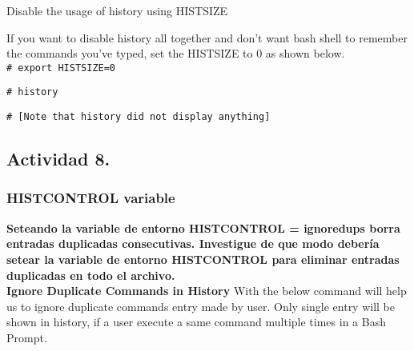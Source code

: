 \documentclass[a4paper,11pt,spanish]{article} %
\begin{document}
Disable the usage of history using HISTSIZE

If you want to disable history all together and don’t want bash shell to remember the 
commands you’ve typed, set the HISTSIZE to 0 as shown below.\\

\texttt{\# export HISTSIZE=0}

\texttt{\# history}

\texttt{\# [Note that history did not display anything]}\\

\cite{tecmint}

\subsection{Actividad 8.}

\subsubsection{HISTCONTROL variable}

\textbf{Seteando la variable de entorno HISTCONTROL = ignoredups borra entradas duplicadas consecutivas.
Investigue de que modo debería setear la variable de entorno HISTCONTROL para 
eliminar entradas duplicadas en todo el archivo.}\\

\textbf{Ignore Duplicate Commands in History}
With the below command will help us to ignore duplicate commands entry made by user. 
Only single entry will be shown in history, if a user execute a same command multiple times in a Bash Prompt.
\end{document}
